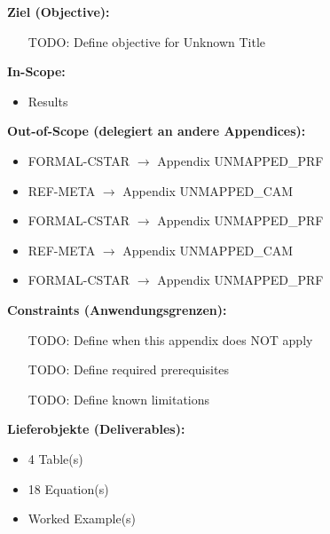%
%
%
%
%


\begin{tcolorbox}[
    colback=orange!5!white,
    colframe=orange!75!black,
    title={\textbf{Appendix Scope: Ziel / In-Scope / Out-of-Scope / Constraints}},
    fonttitle=\bfseries
]

\textbf{Ziel (Objective):}
\begin{itemize}[nosep]
    \item [TODO: Define objective for Unknown Title]
\end{itemize}

\textbf{In-Scope:}
\begin{itemize}[nosep]
    \item Results
\end{itemize}

\textbf{Out-of-Scope (delegiert an andere Appendices):}
\begin{itemize}[nosep]
    \item FORMAL-CSTAR $\rightarrow$ Appendix UNMAPPED_PRF
    \item REF-META $\rightarrow$ Appendix UNMAPPED_CAM
    \item FORMAL-CSTAR $\rightarrow$ Appendix UNMAPPED_PRF
    \item REF-META $\rightarrow$ Appendix UNMAPPED_CAM
    \item FORMAL-CSTAR $\rightarrow$ Appendix UNMAPPED_PRF
\end{itemize}

\textbf{Constraints (Anwendungsgrenzen):}
\begin{itemize}[nosep]
    \item [TODO: Define when this appendix does NOT apply]
    \item [TODO: Define required prerequisites]
    \item [TODO: Define known limitations]
\end{itemize}

\textbf{Lieferobjekte (Deliverables):}
\begin{itemize}[nosep]
    \item 4 Table(s)
    \item 18 Equation(s)
    \item Worked Example(s)
\end{itemize}

\end{tcolorbox}


